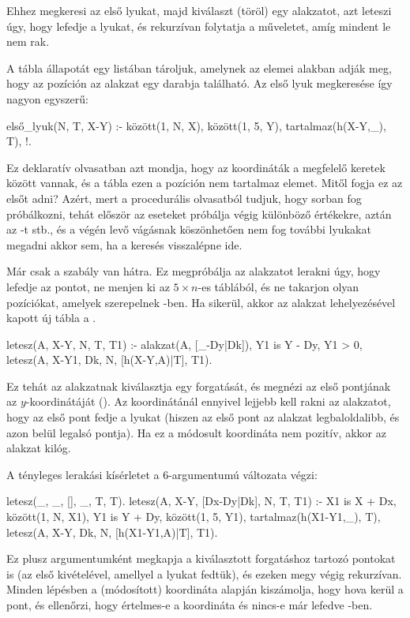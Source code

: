 Ehhez megkeresi az első lyukat, majd kiválaszt
(töröl) egy alakzatot, azt leteszi úgy, hogy lefedje
a lyukat, és rekurzívan folytatja a műveletet, amíg
mindent le nem rak.

A tábla állapotát egy listában tároljuk, amelynek az
elemei  alakban adják meg, hogy az
 pozíción az  alakzat egy darabja
található. Az első lyuk megkeresése így nagyon
egyszerű:
\begin{program}
első_lyuk(N, T, X-Y) :-
    között(1, N, X), között(1, 5, Y),
    \+ tartalmaz(h(X-Y,_), T), !.
\end{program}

Ez deklaratív
olvasatban azt mondja, hogy az  koordináták
a megfelelő keretek között vannak, és a tábla ezen a
pozíción nem tartalmaz elemet. Mitől fogja ez az
elsőt adni? Azért, mert a procedurális olvasatból
tudjuk, hogy sorban fog próbálkozni, tehát először
az  eseteket próbálja végig különböző
 értékekre, aztán az -t stb., és a
végén levő vágásnak köszönhetően nem fog további
lyukakat megadni akkor sem, ha a keresés visszalépne
ide.

Már csak a  szabály van
hátra. Ez megpróbálja az  alakzatot lerakni
úgy, hogy lefedje az  pontot, ne menjen ki
az $5\times n$-es táblából, és ne takarjon olyan
pozíciókat, amelyek szerepelnek -ben. Ha
sikerül, akkor az alakzat lehelyezésével kapott új
tábla a .
\begin{program}
letesz(A, X-Y, N, T, T1) :-
    alakzat(A, [_-Dy|Dk]),
    Y1 is Y - Dy, Y1 > 0,
    letesz(A, X-Y1, Dk, N, [h(X-Y,A)|T], T1).
\end{program}
Ez tehát az  alakzatnak kiválasztja egy
forgatását, és megnézi az első pontjának az
$y$-koordinátáját (). Az  koordinátánál
ennyivel lejjebb kell rakni az alakzatot, hogy az
első pont fedje a lyukat (hiszen az első pont az
alakzat legbaloldalibb, és azon belül legalsó
pontja). Ha ez a módosult  koordináta nem
pozitív, akkor az alakzat kilóg.

A tényleges lerakási kísérletet a 
6-argumentumú változata végzi:
\begin{program}
letesz(_, _, [], _, T, T).
letesz(A, X-Y, [Dx-Dy|Dk], N, T, T1) :-
    X1 is X + Dx, között(1, N, X1),
    Y1 is Y + Dy, között(1, 5, Y1),
    \+ tartalmaz(h(X1-Y1,_), T),
    letesz(A, X-Y, Dk, N, [h(X1-Y1,A)|T], T1).
\end{program}
Ez plusz argumentumként megkapja a kiválasztott
forgatáshoz tartozó pontokat is (az első kivételével,
amellyel a lyukat fedtük), és ezeken megy végig
rekurzívan. Minden lépésben a (módosított) 
koordináta alapján kiszámolja, hogy hova kerül a
pont, és ellenőrzi, hogy értelmes-e a koordináta és
nincs-e már lefedve -ben.

